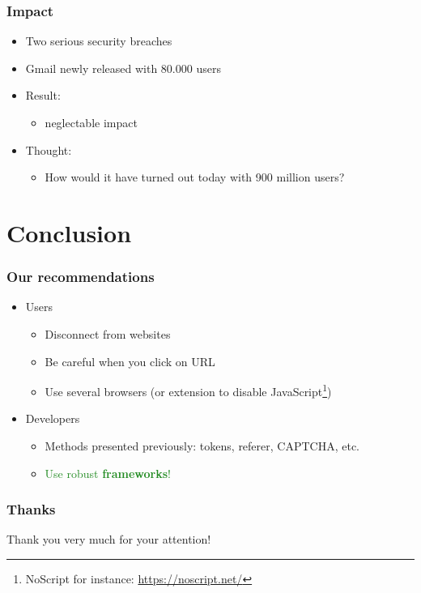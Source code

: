 \documentclass[svgnames]{beamer}
\begin{document}
\begin{frame}
  \frametitle{Impact}
  \begin{itemize}
    \item Two serious security breaches
    \item Gmail newly released with 80.000 users
    \pause
    \item Result:
    \begin{itemize}
      \item neglectable impact
    \end{itemize}
    \pause
    \item Thought:
    \begin{itemize}
      \item How would it have turned out today with 900 million users?
    \end{itemize}
  \end{itemize}
\end{frame}

\section*{Conclusion}
\begin{frame}
  \frametitle{Our recommendations}
  \begin{itemize}
   \item Users
   \pause
   \begin{itemize}
    \item Disconnect from websites
    \item Be careful when you click on URL %
    \item Use several browsers (or extension to disable JavaScript\footnote{NoScript for instance: \url{https://noscript.net/}})
   \end{itemize}
   \pause
   \item Developers
   \begin{itemize}
    \item Methods presented previously: tokens, referer, CAPTCHA, etc.
    \pause
    \item \textcolor{ForestGreen}{Use robust \textbf{frameworks}!} %
   \end{itemize}

  \end{itemize}
\end{frame}


\begin{frame}
  \frametitle{Thanks}
  \begin{center}
    Thank you very much for your attention!
  \end{center}
\end{frame}
\end{document}
